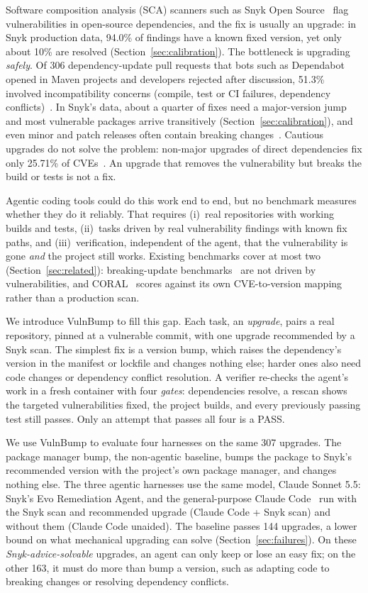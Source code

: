 \documentclass[11pt]{article}
\theoremstyle{definition}
\newcommand{\bench}{VulnBump}
\newcommand{\evo}{Evo Remediation Agent}
\newcommand{\aided}{Claude Code + Snyk scan}
\newcommand{\unaided}{Claude Code unaided}
\newcommand{\pmbump}{package manager bump}
\begin{document}
Software composition analysis (SCA) scanners such as Snyk Open Source~\cite{snykopensource} flag vulnerabilities in open-source dependencies, and the fix is usually an upgrade: in Snyk production data, 94.0\% of findings have a known fixed version, yet only about 10\% are resolved (Section~\ref{sec:calibration}). The bottleneck is upgrading \emph{safely}. Of 306 dependency-update pull requests that bots such as Dependabot opened in Maven projects and developers rejected after discussion, 51.3\% involved incompatibility concerns (compile, test or CI failures, dependency conflicts)~\cite{zhang2023coral}. In Snyk's data, about a quarter of fixes need a major-version jump and most vulnerable packages arrive transitively (Section~\ref{sec:calibration}), and even minor and patch releases often contain breaking changes~\cite{raemaekers2017semver,ochoa2022breakingbad}. Cautious upgrades do not solve the problem: non-major upgrades of direct dependencies fix only 25.71\% of CVEs~\cite{zhang2023coral}. An upgrade that removes the vulnerability but breaks the build or tests is not a fix.

Agentic coding tools could do this work end to end, but no benchmark measures whether they do it reliably. That requires (i)~real repositories with working builds and tests, (ii)~tasks driven by real vulnerability findings with known fix paths, and (iii)~verification, independent of the agent, that the vulnerability is gone \emph{and} the project still works. Existing benchmarks cover at most two (Section~\ref{sec:related}): breaking-update benchmarks~\cite{reyes2024bump,luo2026depbench,yang2026deprepair} are not driven by vulnerabilities, and CORAL~\cite{zhang2023coral} scores against its own CVE-to-version mapping rather than a production scan.

We introduce \bench{} to fill this gap. Each task, an \emph{upgrade}, pairs a real repository, pinned at a vulnerable commit, with one upgrade recommended by a Snyk scan. The simplest fix is a version bump, which raises the dependency's version in the manifest or lockfile and changes nothing else; harder ones also need code changes or dependency conflict resolution. A verifier re-checks the agent's work in a fresh container with four \emph{gates}: dependencies resolve, a rescan shows the targeted vulnerabilities fixed, the project builds, and every previously passing test still passes. Only an attempt that passes all four is a PASS.

We use \bench{} to evaluate four harnesses on the same 307 upgrades. The \pmbump{}, the non-agentic baseline, bumps the package to Snyk's recommended version with the project's own package manager, and changes nothing else. The three agentic harnesses use the same model, Claude Sonnet 5.5: Snyk's \evo{}, and the general-purpose Claude Code~\cite{claudecode} run with the Snyk scan and recommended upgrade (\aided{}) and without them (\unaided{}). The baseline passes 144 upgrades, a lower bound on what mechanical upgrading can solve (Section~\ref{sec:failures}). On these \emph{Snyk-advice-solvable} upgrades, an agent can only keep or lose an easy fix; on the other 163, it must do more than bump a version, such as adapting code to breaking changes or resolving dependency conflicts.
\end{document}
